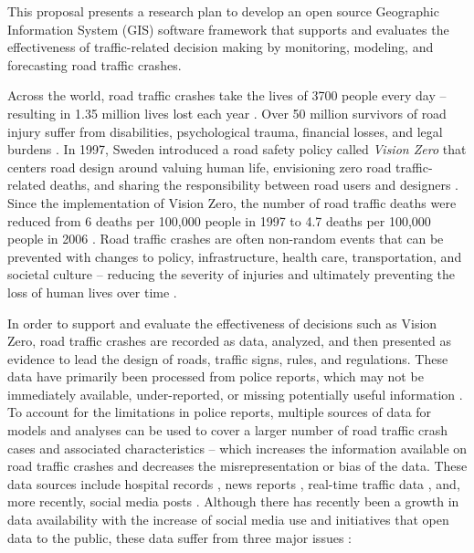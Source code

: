 
This proposal presents a research plan to develop an open source Geographic Information System (GIS) software framework that supports and evaluates the effectiveness of traffic-related decision making by monitoring, modeling, and forecasting road traffic crashes. 

Across the world, road traffic crashes take the lives of 3700 people every day -- resulting in 1.35 million lives lost each year \cite{who2018roadsafetyreport}. Over 50 million survivors of road injury suffer from disabilities, psychological trauma, financial losses, and legal burdens \cite{who2016postcrashresponse}. In 1997, Sweden introduced a road safety policy called \textit{Vision Zero} that centers road design around valuing human life, envisioning zero road traffic-related deaths, and sharing the responsibility between road users and designers \cite{belin2012visionzero}. Since the implementation of Vision Zero, the number of road traffic deaths were reduced from 6 deaths per 100,000 people in 1997 to 4.7 deaths per 100,000 people in 2006 \cite{johansson2009visionzero}. Road traffic crashes are often non-random events that can be prevented with changes to policy, infrastructure, health care, transportation, and societal culture -- reducing the severity of injuries and ultimately preventing the loss of human lives over time \cite{bonilla2014injuriesnotaccidents,brubacher2014reduceroadtraumalaw,who2017savelives}.

In order to support and evaluate the effectiveness of decisions such as Vision Zero, road traffic crashes are recorded as data, analyzed, and then presented as evidence to lead the design of roads, traffic signs, rules, and regulations. These data have primarily been processed from police reports, which may not be immediately available, under-reported, or missing potentially useful information \cite{alsop2001underreportnz,loo2007reportroadcrash}. To account for the limitations in police reports, multiple sources of data for models and analyses can be used to cover a larger number of road traffic crash cases and associated characteristics -- which increases the information available on road traffic crashes and decreases the misrepresentation or bias of the data. These data sources include hospital records \cite{cryer2001biashospitalpolicereports}, news reports \cite{dandona2004trafficdeathssurveillance}, real-time traffic data \cite{roshandel2015realtimecrashreview}, and, more recently, social media posts \cite{wanichayapong2011socialtrafficdata}. Although there has recently been a growth in data availability with the increase of social media use \cite{perrin2015socialmediause} and initiatives that open data to the public, these data suffer from three major issues \cite{janssen2012opendata}:


